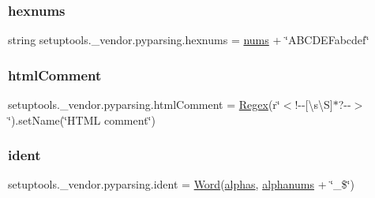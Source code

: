 \mbox{\label{namespacesetuptools_1_1__vendor_1_1pyparsing_a65efda8b212f9098d73df40df3ed0cc9}} 
\subsubsection{\texorpdfstring{hexnums}{hexnums}}
{\footnotesize\ttfamily string setuptools.\+\_\+vendor.\+pyparsing.\+hexnums = \hyperlink{namespacesetuptools_1_1__vendor_1_1pyparsing_a3f511d6c4190141f2a9105c67f3e1f27}{nums} + \char`\"{}A\+B\+C\+D\+E\+Fabcdef\char`\"{}}

\mbox{\label{namespacesetuptools_1_1__vendor_1_1pyparsing_ae2598f755402aec422e1d9977186156f}} 
\subsubsection{\texorpdfstring{html\+Comment}{htmlComment}}
{\footnotesize\ttfamily setuptools.\+\_\+vendor.\+pyparsing.\+html\+Comment = \hyperlink{classsetuptools_1_1__vendor_1_1pyparsing_1_1_regex}{Regex}(r\char`\"{}$<$!-\/-\/\mbox{[}\textbackslash{}s\textbackslash{}S\mbox{]}$\ast$?-\/-\/$>$\char`\"{}).set\+Name(\char`\"{}H\+T\+ML comment\char`\"{})}

\mbox{\label{namespacesetuptools_1_1__vendor_1_1pyparsing_abc961dfe3e230ca908d9304d7786a03b}} 
\subsubsection{\texorpdfstring{ident}{ident}}
{\footnotesize\ttfamily setuptools.\+\_\+vendor.\+pyparsing.\+ident = \hyperlink{classsetuptools_1_1__vendor_1_1pyparsing_1_1_word}{Word}(\hyperlink{namespacesetuptools_1_1__vendor_1_1pyparsing_aa1e79ef7e5382a4dc4dcc6ce37ef91e9}{alphas}, \hyperlink{namespacesetuptools_1_1__vendor_1_1pyparsing_a9441041befe04d1efb091151a019e0b4}{alphanums} + \char`\"{}\+\_\+\$\char`\"{})}

